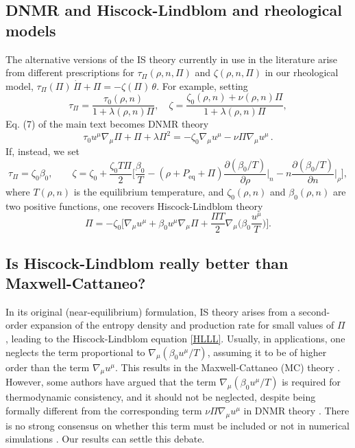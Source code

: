 \documentclass[aps,prl,noshowpacs,noshowkeys,floatfix,superscriptaddress,singlecolum,nofootinbib]{revtex4-2}
\theoremstyle{definition}
\theoremstyle{theorem}
\begin{document}
\subsection{DNMR and Hiscock-Lindblom and rheological models}
The alternative versions of the IS theory currently in use in the literature arise from different prescriptions for $\tau_\Pi(\rho,n,\Pi)$ and $\zeta(\rho,n,\Pi)$ in our rheological model, $\tau_\Pi(\Pi) \, \dot{\Pi}+\Pi=-\zeta(\Pi) \, \theta$. For example, setting
\begin{equation}
\tau_\Pi = \dfrac{\tau_0(\rho,n)}{1+\lambda(\rho,n)\Pi} , \quad
\zeta= \dfrac{\zeta_0(\rho,n)+\nu(\rho,n)\Pi}{1+\lambda(\rho,n)\Pi},
\end{equation}
Eq. (7) of the main text becomes DNMR theory \cite{DMNR2012}
\begin{equation}
\tau_0 u^\mu \nabla_\mu \Pi+\Pi+\lambda \Pi^2 =-\zeta_0 \nabla_\mu u^\mu -\nu \Pi \nabla_\mu u^\mu \, .
\end{equation}
If, instead, we set
\begin{equation}\label{Hisck}
\tau_\Pi= \zeta_0\beta_0 ,\qquad 
\zeta= \zeta_0{+}\dfrac{\zeta_0 T \Pi}{2}\bigg[\dfrac{\beta_0}{T} {-}(\rho{+}P_{\text{eq}}{+}\Pi)\dfrac{\partial (\beta_0/T)}{\partial\rho}\bigg|_n \! \! {-}n\dfrac{\partial(\beta_0/T)}{\partial n}\bigg|_\rho \bigg], 
\end{equation}
where $T(\rho,n)$ is the equilibrium temperature, and $\zeta_0(\rho,n)$ and $\beta_0(\rho,n)$ are two positive functions, one recovers Hiscock-Lindblom theory \cite{Hishcock1983}
\begin{equation}\label{HLLL}
\Pi= -\zeta_0 \bigg[ \nabla_\mu u^\mu +\beta_0 u^\mu \nabla_\mu \Pi +\dfrac{\Pi T}{2} \nabla_\mu \bigg( \beta_0 \dfrac{u^\mu}{T} \bigg) \bigg].
\end{equation}

\subsection*{Is Hiscock-Lindblom really better than Maxwell-Cattaneo?} 

In its original (near-equilibrium) formulation, IS theory arises from a second-order expansion of the entropy density and production rate for small values of $\Pi$ \cite{Israel_Stewart_1979}, leading to the Hiscock-Lindblom equation \eqref{HLLL}. Usually, in applications, one neglects the term proportional to $\nabla_\mu (\beta_0 u^\mu/T)$, assuming it to be of higher order than the term $\nabla_\mu u^\mu$. This results in the Maxwell-Cattaneo (MC) theory \cite{Zakari1993}. However, some authors have argued \cite{Salmonson1991,Zakari1993,Maartens1995,
Zimdahl1996} that the term $\nabla_\mu (\beta_0 u^\mu/T)$ is required for thermodynamic consistency, and it should not be neglected, despite being formally different from the corresponding term $\nu \Pi \nabla_\mu u^\mu$ in DNMR theory \cite{DMNR2012}. There is no strong consensus on whether this term must be included or not in numerical simulations \cite{Dore:2020jye,Chab2021,Camelio2022}. Our results can settle this debate.
\end{document}
